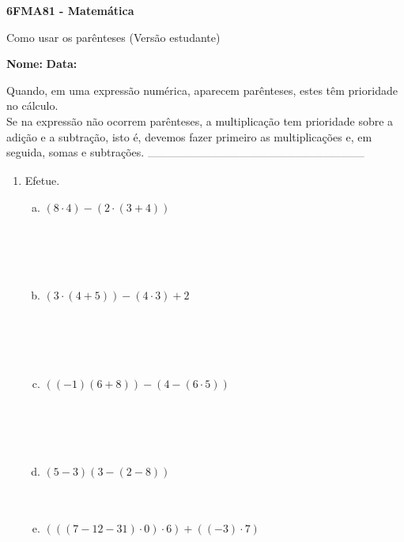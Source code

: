 \documentclass[a4paper,14pt]{article}
\begin{document}
	
	\noindent\textbf{6FMA81 - Matemática} 
	
	\begin{center}Como usar os parênteses (Versão estudante)
	\end{center}
	
	\noindent\textbf{Nome:} \underline{\hspace{10cm}}
	\noindent\textbf{Data:} \underline{\hspace{4cm}}
	
	
	\begin{multicols}{2}
		\noindent Quando, em uma expressão numérica, aparecem parênteses, estes têm prioridade no cálculo. \\
		Se na expressão não ocorrem parênteses, a multiplicação tem prioridade sobre a adição e a subtração, isto é, devemos fazer primeiro as multiplicações e, em seguida, somas e subtrações.
		\noindent\textsubscript{-----------------------------------------------------------------------}
		\begin{enumerate}
			\item Efetue.
			\begin{enumerate}[a)]
				\item $(8 \cdot 4) - (2 \cdot (3 + 4))$ \\\\\\\\\\
				\item $(3 \cdot (4 + 5)) - (4 \cdot 3) + 2$ \\\\\\\\\\
				\item $((-1)(6 + 8)) - (4 - (6 \cdot 5))$ \\\\\\\\\\
				\item $(5 - 3)(3 - (2 - 8))$ \\\\\\
				\item $(((7 - 12 - 31) \cdot 0) \cdot 6) + ((-3) \cdot 7)$ \\\\\\\\\\

\end{enumerate}
\end{enumerate}
\end{multicols}
\end{document}
